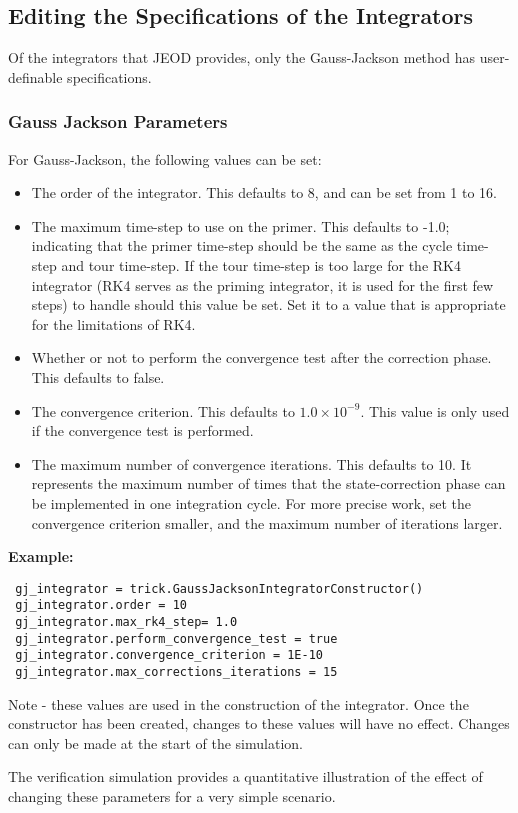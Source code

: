\subsection{Editing the Specifications of the Integrators}
Of the integrators that JEOD provides, only the Gauss-Jackson method has
user-definable specifications.

\subsubsection{Gauss Jackson Parameters}
\label{sec:guide_simuser_gauss_jackson_parameters}
For Gauss-Jackson, the following values can be set:
\begin{itemize}
 \item The order of the integrator.  This defaults to 8, and can be set from 1
 to 16.
 \item The maximum time-step to use on the primer.  This defaults to -1.0;
 indicating that the primer time-step should be the same as the cycle
 time-step and tour time-step.  If the tour time-step is too large for the RK4
 integrator (RK4 serves as the priming integrator, it is used for the first
 few steps) to handle should this value be set.  Set it to a value that is
 appropriate for the limitations of RK4.
 \item Whether or not to perform the convergence test after the correction
 phase.  This defaults to false.
 \item The convergence criterion.  This defaults to $1.0 \times 10^{-9}$.  This
 value is only used if the convergence test is performed.
 \item The maximum number of convergence iterations.  This defaults to 10.  It
 represents the maximum number of times that the state-correction phase can be
 implemented in one integration cycle.  For more precise work, set the
 convergence criterion smaller, and the maximum number of iterations larger.
\end{itemize}

\textbf{Example:}
\begin{verbatim}
 gj_integrator = trick.GaussJacksonIntegratorConstructor()
 gj_integrator.order = 10
 gj_integrator.max_rk4_step= 1.0
 gj_integrator.perform_convergence_test = true
 gj_integrator.convergence_criterion = 1E-10
 gj_integrator.max_corrections_iterations = 15

\end{verbatim}

Note - these values are used in the construction of the integrator.  Once the
constructor has been created, changes to these values will have no effect.
Changes can only be made at the start of the simulation.

The verification simulation 
provides a quantitative
illustration of the effect of changing these parameters for a very simple
scenario.

